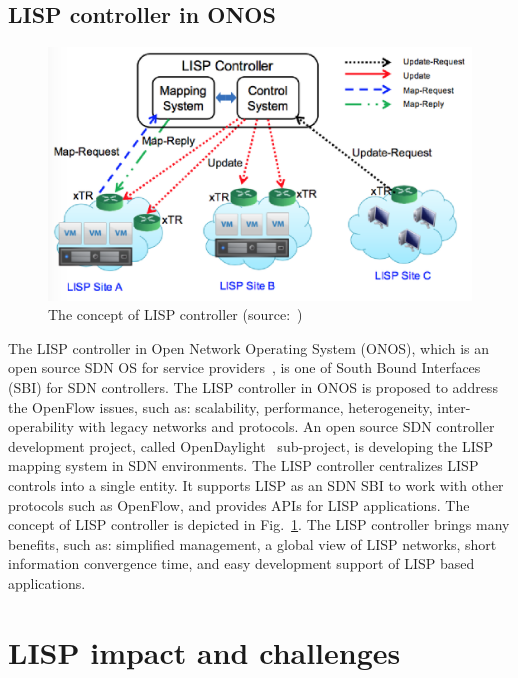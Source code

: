 \subsection{LISP controller in ONOS}
\label{subsec:implementation_onos}
\begin{figure}[!t]
	\centering
	\includegraphics[width=\textwidth]{Pics/concept_of_LISP_controller.eps}
	\caption{The concept of LISP controller (source:~\cite{han2016design})}
	\label{concept_of_LISP_controller}
\end{figure}
The LISP controller in Open Network Operating System (ONOS), which is an open source SDN OS for service providers~\cite{han2016design}, is one of South Bound Interfaces (SBI) for SDN controllers. The LISP controller in ONOS is proposed to address the OpenFlow issues, such as: scalability, performance, heterogeneity, inter-operability with legacy networks and protocols. An open source SDN controller development project, called OpenDaylight~\cite{OpenDaylight} sub-project, is developing the LISP mapping system in SDN environments. The LISP controller centralizes LISP controls into a single entity. It supports LISP as an SDN SBI to work with other protocols such as OpenFlow, and provides APIs for LISP applications. The concept of LISP controller is depicted in Fig.~\ref{concept_of_LISP_controller}. The LISP controller brings many benefits, such as: simplified management, a global view of LISP networks, short information convergence time, and easy development support of LISP based applications. 


\label{subsec:related_studies}
\section{LISP impact and challenges}
\label{subsec:studies_impact}
